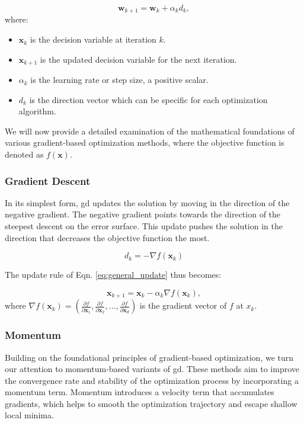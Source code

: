 \begin{equation}
\mathbf{w}_{k+1} = \mathbf{w}_k + \alpha_k d_k,
\label{eq:general_update}
\end{equation}
where:
\begin{itemize}
    \item $\mathbf{x}_k$ is the decision variable at iteration $k$.
    \item $\mathbf{x}_{k+1}$ is the updated decision variable for the next iteration.
    \item $\alpha_k$ is the learning rate or step size, a positive scalar.
    \item $d_k$ is the direction vector which can be specific for each optimization algorithm.
\end{itemize}

\noindent 
We will now provide a detailed examination of the mathematical foundations of various gradient-based optimization methods, where the objective function is denoted as $f(\mathbf{x})$.

\subsubsection{Gradient Descent}
\label{subsubsection:gradient_descent}

\noindent In its simplest form, \ac{gd} updates the solution by moving in the direction of the negative gradient. The negative gradient points towards the direction of the steepest descent on the error surface. This update pushes the solution in the direction that decreases the objective function the most.

\begin{equation*}
d_k = -\nabla f(\mathbf{x}_k)
\end{equation*}

\noindent The update rule of Eqn. \eqref{eq:general_update} thus becomes:

\begin{equation*}
\mathbf{x}_{k+1} = \mathbf{x}_k - \alpha_k \nabla f(\mathbf{x}_k),
\label{eq:gd_update}
\end{equation*}
where $\nabla f(\mathbf{x}_k) = \left(\frac{\partial f}{\partial \mathbf{x}_1}, \frac{\partial f}{\partial \mathbf{x}_2}, \dots, \frac{\partial f}{\partial \mathbf{x}_d} \right)$ is the gradient vector of $f$ at $x_k$.




\subsubsection{Momentum}
\label{subsubsection:momentum}
Building on the foundational principles of gradient-based optimization, we turn our attention to momentum-based variants of \ac{gd}. These methods aim to improve the convergence rate and stability of the optimization process by incorporating a momentum term.
Momentum introduces a velocity term that accumulates gradients, which helps to smooth the optimization trajectory and escape shallow local minima.

